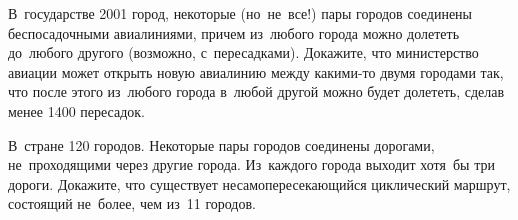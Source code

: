 \begin{problems}

\item
В~государстве 2001 город, некоторые (но~не~все!) пары городов соединены
беспосадочными авиалиниями, причем из~любого города можно долететь до~любого
другого (возможно, с~пересадками).
Докажите, что министерство авиации может открыть новую авиалинию между
какими-то двумя городами так, что после этого из~любого города в~любой другой
можно будет долететь, сделав менее 1400 пересадок.

\item
В~стране 120 городов.
Некоторые пары городов соединены дорогами, не~проходящими через другие города.
Из~каждого города выходит хотя~бы три дороги.
Докажите, что существует несамопересекающийся циклический маршрут, состоящий
не~более, чем из~11 городов.

\end{problems}

